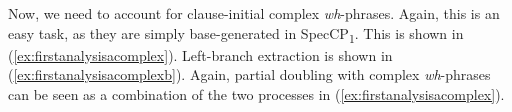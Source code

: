 %
%
%
%

\noindent Now, we need to account for clause-initial complex \textit{wh}-phrases. Again, this is an easy task, as they are simply base-generated in SpecCP\textsubscript{1}. This is shown in (\ref{ex:firstanalysisacomplex}). Left-branch extraction is shown in (\ref{ex:firstanalysisacomplexb}). Again, partial doubling with complex \textit{wh}-phrases can be seen as a combination of the two processes in (\ref{ex:firstanalysisacomplex}).




\clearpage


